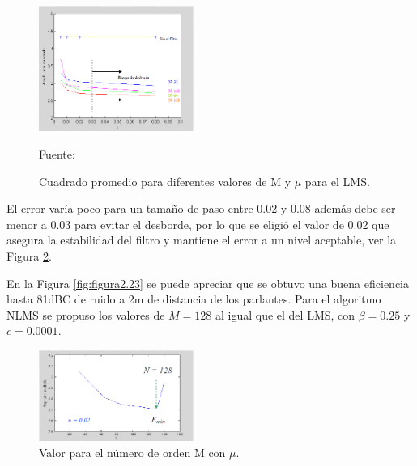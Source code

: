 \begin{enumerate}
\begin{figure}[ht]
\begin{center}
\includegraphics[width=0.45\textwidth]{Imagenes/Cap2/image022}
\end{center}
\begin{center}
\vskip -0.5cm
\caption{\small{Cuadrado promedio para diferentes valores de M y $\mu$ para el LMS.}}
\label{fig:figura2.21}
{\small{Fuente: \cite{simon}}}
\end{center}
\end{figure}
\vskip -0.5cm
El error varía poco para un tamaño de paso entre 0.02 y 0.08 además debe ser menor a 0.03 para evitar el desborde, por lo que se eligió el valor de 0.02 que asegura la estabilidad del filtro y mantiene el error a un nivel aceptable, ver la Figura \ref{fig:figura2.22}.

En la Figura \ref{fig:figura2.23} se puede apreciar que se obtuvo una buena eficiencia hasta 81dBC de ruido a 2m de distancia de los parlantes. Para el algoritmo NLMS se propuso los valores de $M =128$ al igual que el del LMS, con $\beta = 0.25$ y $c = 0.0001$.

\newpage
\begin{figure}[ht]
\begin{center}
\includegraphics[width=0.45\textwidth]{Imagenes/Cap2/image023}
\end{center}
\begin{center}
\vskip -0.5cm
\caption{\small{Valor para el número de orden M con $\mu$.}}
\label{fig:figura2.22}


\end{center}
\end{figure}
\end{enumerate}
